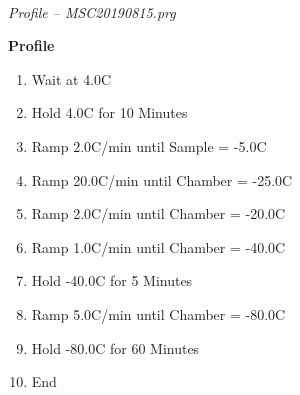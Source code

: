 \documentclass[UTF8,10pt,a4paper,fontset=fandol]{ctexart}
\newcommand{\fieldvalue}[1]{#1}
\begin{document}
\medskip
\noindent{}\\
\noindent\textit{Profile -- MSC20190815.prg}

\medskip
\noindent
\begin{minipage}[t]{0.48\linewidth}
\textbf{Profile}

\begin{enumerate}
\item
\fieldvalue{Wait at 4.0\textdegree C}
\item
\fieldvalue{Hold 4.0\textdegree C for 10 Minutes}
\item
\fieldvalue{Ramp 2.0\textdegree C/min until Sample = -5.0\textdegree C}
\item
\fieldvalue{Ramp 20.0\textdegree C/min until Chamber = -25.0\textdegree C}
\item
\fieldvalue{Ramp 2.0\textdegree C/min until Chamber = -20.0\textdegree C}
\item
\fieldvalue{Ramp 1.0\textdegree C/min until Chamber = -40.0\textdegree C}
\item
\fieldvalue{Hold -40.0\textdegree C for 5 Minutes}
\item
\fieldvalue{Ramp 5.0\textdegree C/min until Chamber = -80.0\textdegree C}
\item
\fieldvalue{Hold -80.0\textdegree C for 60 Minutes}
\item End
\end{enumerate}
\end{minipage}
\hfill
\end{document}
